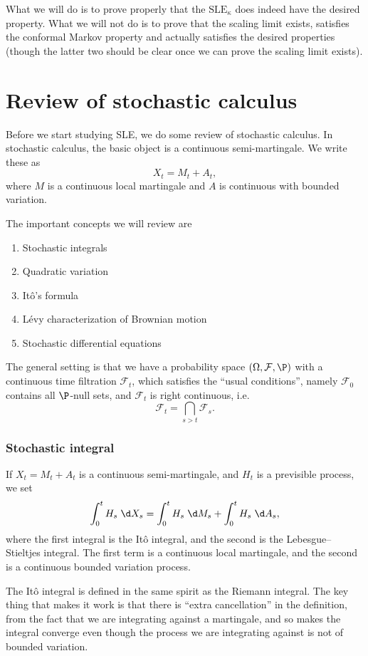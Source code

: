 \documentclass[a4paper]{article}
\newcommand\SLE{\mathrm{SLE}}
\begin{document}
What we will do is to prove properly that the $\SLE_\kappa$ does indeed have the desired property. What we will not do is to prove that the scaling limit exists, satisfies the conformal Markov property and actually satisfies the desired properties (though the latter two should be clear once we can prove the scaling limit exists).

\section{Review of stochastic calculus}
Before we start studying SLE, we do some review of stochastic calculus. In stochastic calculus, the basic object is a continuous semi-martingale. We write these as
\[
  X_t = M_t + A_t,
\]
where $M$ is a continuous local martingale and $A$ is continuous with bounded variation.

The important concepts we will review are
\begin{enumerate}
  \item Stochastic integrals
  \item Quadratic variation
  \item It\^o's formula
  \item L\'evy characterization of Brownian motion
  \item Stochastic differential equations
\end{enumerate}

The general setting is that we have a probability space $(\Omega, \mathcal{F}, \P)$ with a continuous time filtration $\mathcal{F}_t$, which satisfies the ``usual conditions'', namely $\mathcal{F}_0$ contains all $\P$-null sets, and $\mathcal{F}_t$ is right continuous, i.e.
\[
  \mathcal{F}_t = \bigcap_{s > t} \mathcal{F}_s.
\]
\subsubsection*{Stochastic integral}
If $X_t = M_t + A_t$ is a continuous semi-martingale, and $H_t$ is a previsible process, we set
\[
  \int_0^t H_s \;\d X_s = \int_0^t H_s \;\d M_s + \int_0^t H_s \;\d A_s,
\]
where the first integral is the It\^o integral, and the second is the Lebesgue--Stieltjes integral. The first term is a continuous local martingale, and the second is a continuous bounded variation process.

The It\^o integral is defined in the same spirit as the Riemann integral. The key thing that makes it work is that there is ``extra cancellation'' in the definition, from the fact that we are integrating against a martingale, and so makes the integral converge even though the process we are integrating against is not of bounded variation.
\end{document}
